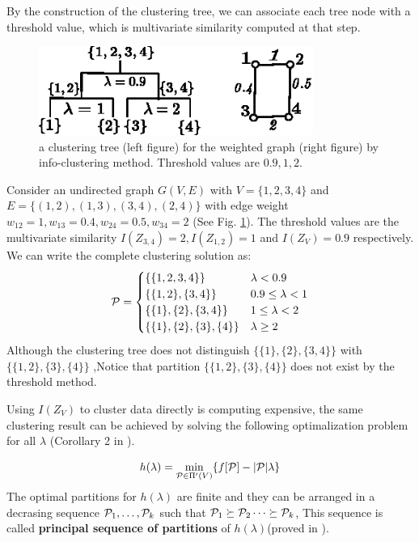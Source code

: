 \documentclass{article}
\begin{document}
By the construction of the clustering tree, we can associate each tree node with a threshold value, which is multivariate similarity computed at that step.
\begin{example}
\begin{figure}
\centering
\includegraphics[width=0.8\textwidth]{pic/threshold.eps}
\caption{a clustering tree (left figure) for the weighted graph (right figure) by info-clustering method. Threshold values are $0.9, 1, 2$.}\label{fig:threshold}
\end{figure}
Consider an undirected graph $G(V, E)$ with $V=\{1,2,3,4\}$ and $E=\{(1,2),(1,3),(3,4),(2,4)\}$ with edge weight $w_{12}=1,w_{13}=0.4,w_{24}=0.5,w_{34}=2$ (See Fig. \ref{fig:threshold}). The threshold values are the multivariate similarity $I(Z_{3,4})=2, I(Z_{1,2})=1$ and $I(Z_V)=0.9$ respectively. We can write the complete clustering solution as:
\begin{equation*}
\P = 
\begin{cases}
\{\{1,2,3,4\}\} & \lambda < 0.9 \\
\{\{1,2\},\{3,4\}\} & 0.9 \leq \lambda < 1 \\
\{\{1\},\{2\},\{3,4\}\} & 1 \leq \lambda < 2\\
\{\{1\},\{2\},\{3\},\{4\}\} & \lambda \geq 2
\end{cases}
\end{equation*}
Although the clustering tree does not distinguish $\{\{1\},\{2\},\{3,4\}\}$ with $\{\{1,2\},\{3\}, \{4\}\}$ ,Notice that partition $\{\{1,2\},\{3\}, \{4\}\}$ does not exist by the threshold method.
\end{example}
Using $I(Z_V)$ to cluster data directly is computing expensive, the same clustering result can be achieved by solving the following optimalization problem for all $\lambda$ (Corollary 2 in \cite{RN1}).
\begin{theorem}\label{thm:psp}
\begin{equation}\label{eq:hL}
h(\lambda) = \min_{\P \in \Pi'(V)}\{ f[\P] - \abs{\P} \lambda \}
\end{equation}
The optimal partitions for $h(\lambda)$ are finite and they can be arranged in a decrasing sequence $\P_1, \dots, \P_k$ such that $\P_1 \succeq \P_2 \dots \succeq \P_k$, This sequence is called \textbf{principal sequence of partitions} of $h(\lambda)$(proved in \cite{RN3}).
\end{theorem}
\end{document}
